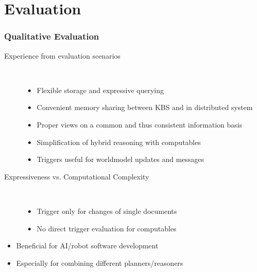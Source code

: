 \section{Evaluation}
\begin{frame}
  \frametitle{Qualitative Evaluation}
  \begin{description}
  \item[Experience from evaluation scenarios]%
                \hfill \\
    \begin{itemize}
    \item Flexible storage and expressive querying
    \item Convenient memory sharing between KBS and in distributed system
    \item Proper views on a common and thus consistent information basis
    \item Simplification of hybrid reasoning with computables
    \item Triggers useful for worldmodel updates and messages
    \end{itemize}
  \item[Expressiveness vs. Computational Complexity]%
                \hfill \\
    \begin{itemize}
    \item Trigger only for changes of single documents %
    \item No direct trigger evaluation for computables %
    \end{itemize}
  \end{description}

\begin{block}{}%
  \begin{itemize}
  \item Beneficial for AI/robot software development
  \item Especially for combining different planners/reasoners
  \end{itemize}
  \end{block}
\end{frame}

